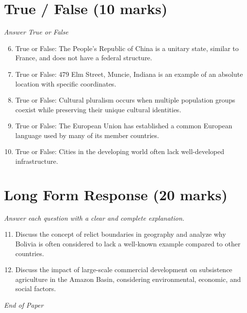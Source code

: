 \documentclass[12pt]{article}
\begin{document}
\section*{True / False (10 marks)}
\textit{Answer True or False}
\begin{enumerate}[label=\arabic*.]
\setcounter{enumi}{5}
\item True or False: The People's Republic of China is a unitary state, similar to France, and does not have a federal structure.
\item True or False: 479 Elm Street, Muncie, Indiana is an example of an absolute location with specific coordinates.
\item True or False: Cultural pluralism occurs when multiple population groups coexist while preserving their unique cultural identities.
\item True or False: The European Union has established a common European language used by many of its member countries.
\item True or False: Cities in the developing world often lack well-developed infrastructure.
\end{enumerate}

\section*{Long Form Response (20 marks)}
\textit{Answer each question with a clear and complete explanation.}
\begin{enumerate}[label=\arabic*.]
\setcounter{enumi}{10}
\item Discuss the concept of relict boundaries in geography and analyze why Bolivia is often considered to lack a well-known example compared to other countries.
\item Discuss the impact of large-scale commercial development on subsistence agriculture in the Amazon Basin, considering environmental, economic, and social factors.
\end{enumerate}

\vfill
\noindent\textit{End of Paper}
\end{document}
